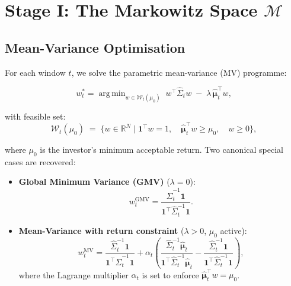 \documentclass[12pt, a4paper]{report}
\theoremstyle{plain}
\theoremstyle{definition}
\newcommand{\R}{\mathbb{R}}
\newcommand{\calM}{\mathcal{M}}
\newcommand{\calW}{\mathcal{W}}
\newcommand{\bmu}{\bm{\mu}}
\newcommand{\bone}{\mathbf{1}}
\DeclareMathOperator*{\argmin}{arg\,min}
\begin{document}
\section{Stage I: The Markowitz Space \texorpdfstring{$\calM$}{M}}
\label{sec:markowitz_space}

\subsection{Mean-Variance Optimisation}
\label{subsec:mv_opt}

For each window $t$, we solve the parametric mean-variance (MV) programme:

\begin{equation}
  \boxed{
  w_t^* = \argmin_{w \in \calW_t(\mu_0)}\;
          w^\top \hat{\Sigma}_t w \;-\; \lambda\,\hat{\bmu}_t^\top w,
  }
  \label{eq:mv_main}
\end{equation}

with feasible set:
\begin{equation}
  \calW_t(\mu_0) \;=\;
  \bigl\{ w \in \R^N \;\big|\;
    \bone^\top w = 1,\quad
    \hat{\bmu}_t^\top w \ge \mu_0,\quad
    w \ge 0
  \bigr\},
  \label{eq:feasible_set}
\end{equation}

where $\mu_0$ is the investor's minimum acceptable return.  Two canonical
special cases are recovered:

\begin{itemize}
  \item \textbf{Global Minimum Variance (GMV)} ($\lambda = 0$):
  \begin{equation}
    w_t^{\text{GMV}} = \frac{\hat{\Sigma}_t^{-1}\bone}
                            {\bone^\top \hat{\Sigma}_t^{-1}\bone}.
    \label{eq:gmv}
  \end{equation}

  \item \textbf{Mean-Variance with return constraint} ($\lambda > 0$, $\mu_0$ active):
  \begin{equation}
    w_t^{\text{MV}} =
      \frac{\hat{\Sigma}_t^{-1}\bone}{\bone^\top\hat{\Sigma}_t^{-1}\bone}
      + \alpha_t\!\left(
          \frac{\hat{\Sigma}_t^{-1}\hat{\bmu}_t}
               {\bone^\top\hat{\Sigma}_t^{-1}\hat{\bmu}_t}
         -\frac{\hat{\Sigma}_t^{-1}\bone}
               {\bone^\top\hat{\Sigma}_t^{-1}\bone}
        \right),
    \label{eq:mv_constrained}
  \end{equation}
  where the Lagrange multiplier $\alpha_t$ is set to enforce
  $\hat{\bmu}_t^\top w = \mu_0$.
\end{itemize}
\end{document}

